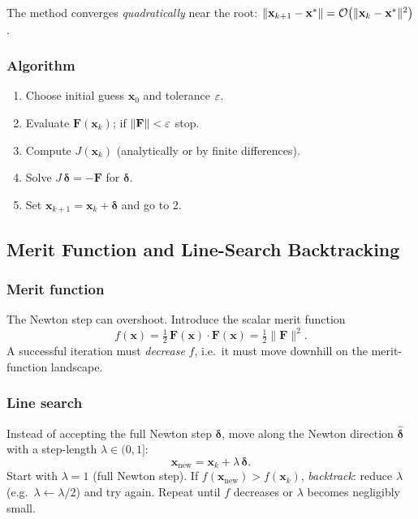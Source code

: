 The method converges \emph{quadratically} near the root:
$\|\mathbf{x}_{k+1}-\mathbf{x}^*\| = \mathcal{O}\!\left(\|\mathbf{x}_k - \mathbf{x}^*\|^2\right)$.

\subsubsection*{Algorithm}
\begin{enumerate}
  \item Choose initial guess $\mathbf{x}_0$ and tolerance $\varepsilon$.
  \item Evaluate $\mathbf{F}(\mathbf{x}_k)$; if $\|\mathbf{F}\|<\varepsilon$ stop.
  \item Compute $J(\mathbf{x}_k)$ (analytically or by finite differences).
  \item Solve $J\,\boldsymbol{\delta} = -\mathbf{F}$ for $\boldsymbol{\delta}$.
  \item Set $\mathbf{x}_{k+1} = \mathbf{x}_k + \boldsymbol{\delta}$ and go to 2.
\end{enumerate}


\subsection{Merit Function and Line-Search Backtracking}\label{subsec:lec10:linesearch}

\subsubsection*{Merit function}
The Newton step can overshoot.  Introduce the scalar merit function
\begin{equation}
  f(\mathbf{x}) = \tfrac{1}{2}\,\mathbf{F}(\mathbf{x})\cdot\mathbf{F}(\mathbf{x})
                = \tfrac{1}{2}\|\mathbf{F}\|^2.
  \label{eq:lec10:merit}
\end{equation}
A successful iteration must \emph{decrease} $f$, i.e.\ it must move
downhill on the merit-function landscape.

\subsubsection*{Line search}
Instead of accepting the full Newton step $\boldsymbol{\delta}$,
move along the Newton direction $\hat{\boldsymbol{\delta}}$ with a
step-length $\lambda\in(0,1]$:
\begin{equation}
  \mathbf{x}_{\text{new}} = \mathbf{x}_k + \lambda\,\boldsymbol{\delta}.
  \label{eq:lec10:step}
\end{equation}
Start with $\lambda=1$ (full Newton step).  If
$f(\mathbf{x}_{\text{new}}) > f(\mathbf{x}_k)$, \emph{backtrack}:
reduce $\lambda$ (e.g.\ $\lambda \leftarrow \lambda/2$) and try again.
Repeat until $f$ decreases or $\lambda$ becomes negligibly small.

